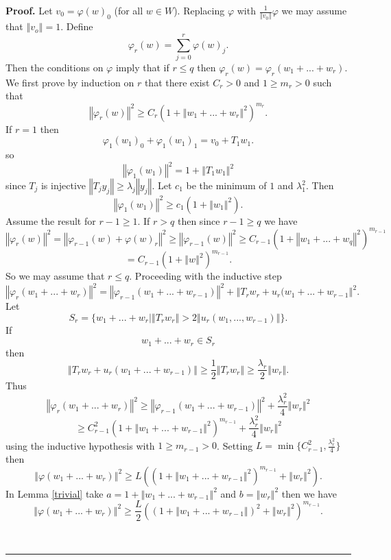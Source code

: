 \documentclass[10pt,a4paper]{amsart}
\newenvironment{proof}[1][Proof]{\noindent\textbf{#1.} }{\ \rule{0.5em}{0.5em}}
\begin{document}
\begin{proof}
Let $v_{0}=\varphi(w)_{0}$ (for all $w\in W$). Replacing $\varphi$ with
$\frac{1}{\left\Vert v_{0}\right\Vert }\varphi$ we may assume that $\left\Vert
v_{o}\right\Vert =1$. Define%
\[
\varphi_{r}(w)=\sum_{j=0}^{r}\varphi(w)_{j}.
\]
Then the conditions on $\varphi$ imply that if $r\leq q$ then $\varphi
_{r}(w)=\varphi_{r}(w_{1}+...+w_{r})$. We first prove by induction on $r$ that
there exist $C_{r}>0$ and $1\geq m_{r}>0$ such that
\[
\left\Vert \varphi_{r}(w)\right\Vert ^{2}\geq C_{r}(1+\left\Vert
w_{1}+...+w_{r}\right\Vert ^{2})^{m_{r}}.
\]
If $r=1$ then
\[
\varphi_{1}(w_{1})_{0}+\varphi_{1}(w_{1})_{1}=v_{0}+T_{1}w_{1}.
\]
so%
\[
\left\Vert \varphi_{1}(w_{1})\right\Vert ^{2}=1+\left\Vert T_{1}%
w_{1}\right\Vert ^{2}
\]
since $T_{j}$ is injective \thinspace$\left\Vert T_{j}y_{j}\right\Vert
\geq\lambda_{j}\left\Vert y_{j}\right\Vert $. Let $c_{1}$ be the minimum of
$1$ and $\lambda_{1}^{2}$. Then
\[
\left\Vert \varphi_{1}(w_{1})\right\Vert ^{2}\geq c_{1}(1+\left\Vert
w_{1}\right\Vert ^{2}).
\]
Assume the result for $r-1\geq1$. If $r>q$ then since $r-1\geq q$ we have
\[
\left\Vert \varphi_{r}(w)\right\Vert ^{2}=\left\Vert \varphi_{r-1}%
(w)+\varphi(w)_{r}\right\Vert ^{2}\geq\left\Vert \varphi_{r-1}(w)\right\Vert
^{2}\geq C_{r-1}(1+\left\Vert w_{1}+...+w_{q}\right\Vert ^{2})^{m_{r-1}}
\]%
\[
=C_{r-1}(1+\left\Vert w\right\Vert ^{2})^{m_{r-1}}.
\]
So we may assume that $r\leq q$. Proceeding with the inductive step
\[
\left\Vert \varphi_{r}(w_{1}+...+w_{r})\right\Vert ^{2}=\left\Vert
\varphi_{r-1}(w_{1}+...+w_{r-1})\right\Vert ^{2}+\left\Vert T_{r}w_{r}%
+u_{r}(w_{1}+...+w_{r-1}\right\Vert ^{2}.
\]
Let
\[
S_{r}=\{w_{1}+...+w_{r}|\left\Vert T_{r}w_{r}\right\Vert >2\left\Vert
u_{r}(w_{1},...,w_{r-1})\right\Vert \}.
\]
If
\[
w_{1}+...+w_{r}\in S_{r}
\]
then%
\[
\left\Vert T_{r}w_{r}+u_{r}(w_{1}+...+w_{r-1})\right\Vert \geq\frac{1}%
{2}\left\Vert T_{r}w_{r}\right\Vert \geq\frac{\lambda_{r}}{2}\left\Vert
w_{r}\right\Vert .
\]
Thus%
\[
\left\Vert \varphi_{r}(w_{1}+...+w_{r})\right\Vert ^{2}\geq\left\Vert
\varphi_{r-1}(w_{1}+...+w_{r-1})\right\Vert ^{2}+\frac{\lambda_{r}^{2}}%
{4}\left\Vert w_{r}\right\Vert ^{2}
\]%
\[
\geq C_{r-1}^{2}(1+\left\Vert w_{1}+...+w_{r-1}\right\Vert ^{2})^{m_{r-1}%
}+\frac{\lambda_{r}^{2}}{4}\left\Vert w_{r}\right\Vert ^{2}
\]
using the inductive hypothesis with $1\geq m_{r-1}>0$. Setting $L=\min
\{C_{r-1}^{2},\frac{\lambda_{r}^{2}}{4}\}$ then%
\[
\left\Vert \varphi(w_{1}+...+w_{r})\right\Vert ^{2}\geq L((1+\left\Vert
w_{1}+...+w_{r-1}\right\Vert ^{2})^{m_{r-1}}+\left\Vert w_{r}\right\Vert
^{2}).
\]
In Lemma \ref{trivial} take $a=1+\left\Vert w_{1}+...+w_{r-1}\right\Vert ^{2}
$ and $b=\left\Vert w_{r}\right\Vert ^{2}$ then we have%
\[
\left\Vert \varphi(w_{1}+...+w_{r})\right\Vert ^{2}\geq\frac{L}{2}%
((1+\left\Vert w_{1}+...+w_{r-1}\right\Vert )^{2}+\left\Vert w_{r}\right\Vert
^{2})^{m_{r-1}}.
\]



\end{proof}
\end{document}
